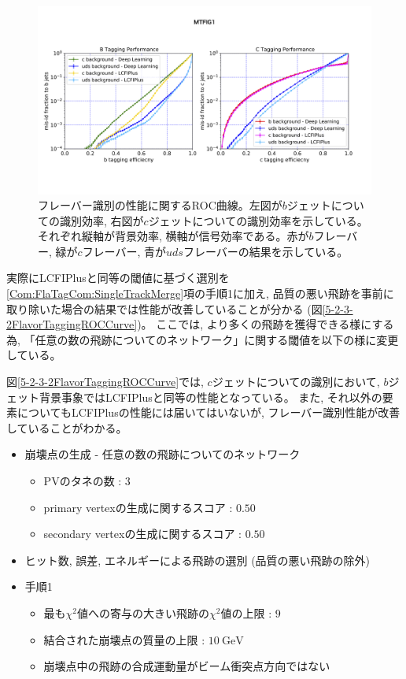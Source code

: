 \begin{figure}[htbp]
 \centering
 \includegraphics[trim = 0 150 0 200, width=1.0\textwidth, clip]{Figure/5Comparison/5-2-3-1FlavorTaggingROCCurve.png}
 \caption[フレーバータギングの性能に関するROC曲線]{フレーバー識別の性能に関するROC曲線。左図が$b$ジェットについての識別効率, 右図が$c$ジェットについての識別効率を示している。それぞれ縦軸が背景効率, 横軸が信号効率である。赤が$b$フレーバー, 緑が$c$フレーバー, 青が$uds$フレーバーの結果を示している。}
 \label{5-2-3-1FlavorTaggingROCCurve}
\end{figure}

実際にLCFIPlusと同等の閾値に基づく選別を\ref{Com:FlaTagCom:SingleTrackMerge}項の手順1に加え, 品質の悪い飛跡を事前に取り除いた場合の結果では性能が改善していることが分かる (図\ref{5-2-3-2FlavorTaggingROCCurve})。
ここでは, より多くの飛跡を獲得できる様にする為, 「任意の数の飛跡についてのネットワーク」に関する閾値を以下の様に変更している。

図\ref{5-2-3-2FlavorTaggingROCCurve}では, $c$ジェットについての識別において, $b$ジェット背景事象ではLCFIPlusと同等の性能となっている。
また, それ以外の要素についてもLCFIPlusの性能には届いてはいないが, フレーバー識別性能が改善していることがわかる。

\newpage
\begin{itemize}
 \item 崩壊点の生成 - 任意の数の飛跡についてのネットワーク
 \begin{itemize}
   \item PVのタネの数 : $3$
   \item primary vertexの生成に関するスコア : $0.50$
   \item secondary vertexの生成に関するスコア : $0.50$
 \end{itemize}
 \item ヒット数, 誤差, エネルギーによる飛跡の選別 (品質の悪い飛跡の除外)
 \item 手順1
 \begin{itemize}
  \item 最も$\chi^2$値への寄与の大きい飛跡の$\chi^2$値の上限 : $9$
  \item 結合された崩壊点の質量の上限 : $10\ \mathrm{GeV}$
  \item 崩壊点中の飛跡の合成運動量がビーム衝突点方向ではない
 \end{itemize}
\end{itemize}

